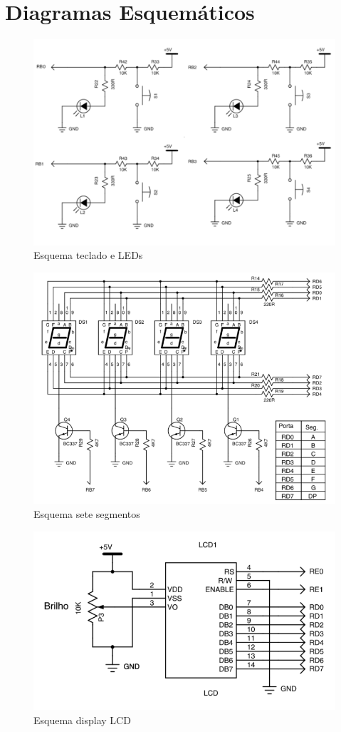 \documentclass{article}
\begin{document}
\section{Diagramas Esquemáticos}

\begin{figure}[H]
	\centering
	\includegraphics[width=0.7\linewidth]{esq_ledswi}
	\caption{Esquema teclado e LEDs}
	\label{fig:esq_ledswi}
\end{figure}
\begin{figure}[H]
	\centering
	\includegraphics[width=0.9\linewidth]{esq_7seg}
	\caption{Esquema sete segmentos}
	\label{fig:esq_7seg}
\end{figure}
\begin{figure}[H]
	\centering
	\includegraphics[width=0.9\linewidth]{esq_lcd}
	\caption{Esquema display LCD}
	\label{fig:esq_lcd}
\end{figure}
\end{document}
